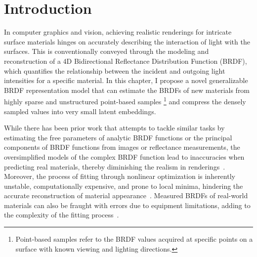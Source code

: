 

\section{Introduction}
\label{sec:intro}


In computer graphics and vision, achieving realistic renderings for intricate surface materials hinges on accurately describing the interaction of light with the surfaces. This is conventionally conveyed through the modeling and reconstruction of a 4D Bidirectional Reflectance Distribution Function (BRDF), which quantifies the relationship between the incident and outgoing light intensities for a specific material. In this chapter, I propose a novel generalizable BRDF representation model that can estimate the BRDFs of new materials from highly sparse and unstructured point-based samples \footnote{Point-based samples refer to the BRDF values acquired at specific points on a surface with known viewing and lighting directions.} and compress the densely sampled values into very small latent embeddings.


While there has been prior work that attempts to tackle similar tasks by estimating the free parameters of analytic BRDF functions or the principal components of BRDF functions from images or reflectance measurements, the oversimplified models of the complex BRDF function lead to inaccuracies when predicting real materials, thereby diminishing the realism in renderings~\cite{ngan2005}. Moreover, the process of fitting through nonlinear optimization is inherently unstable, computationally expensive, and prone to local minima, hindering the accurate reconstruction of material appearance~\cite{dupuy2015, guarnera2016}. Measured BRDFs of real-world materials can also be fraught with errors due to equipment limitations, adding to the complexity of the fitting process~\cite{nielsen2015optimal}. 

